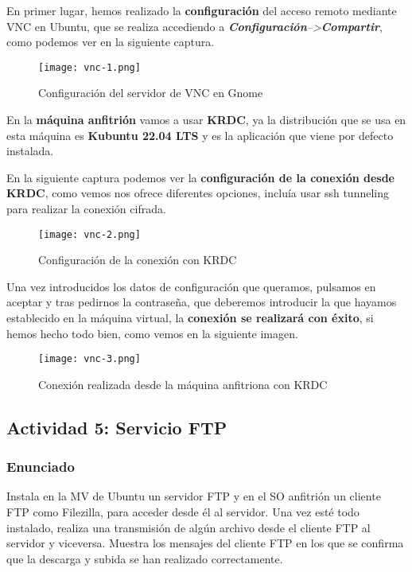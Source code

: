 \begin{itemize}
    En primer lugar, hemos realizado la \textbf{configuración} del acceso remoto mediante VNC en Ubuntu, que se realiza accediendo a \textit{\textbf{Configuración}-->\textbf{Compartir}}, como podemos ver en la siguiente captura.

    \begin{figure}[H]
        \centering
        \texttt{[image: vnc-1.png]}
        \caption{Configuración del servidor de VNC en Gnome}
    \end{figure}

    En la \textbf{máquina anfitrión} vamos a usar \textbf{KRDC}, ya la distribución que se usa en esta máquina es \textbf{Kubuntu 22.04 LTS} y es la aplicación que viene por defecto instalada.

    En la siguiente captura podemos ver la \textbf{configuración de la conexión desde KRDC}, como vemos nos ofrece diferentes opciones, incluía usar ssh tunneling para realizar la conexión cifrada.

    \begin{figure}[H]
        \centering
        \texttt{[image: vnc-2.png]}
        \caption{Configuración de la conexión con KRDC}
    \end{figure}

    Una vez introducidos los datos de configuración que queramos, pulsamos en aceptar y tras pedirnos la contraseña, que deberemos introducir la que hayamos establecido en la máquina virtual, la \textbf{conexión se realizará con éxito}, si hemos hecho todo bien, como vemos en la siguiente imagen.

    \begin{figure}[H]
        \centering
        \texttt{[image: vnc-3.png]}
        \caption{Conexión realizada desde la máquina anfitriona con KRDC}
    \end{figure}
\end{itemize}

\subsection{Actividad 5: Servicio FTP}

\subsubsection{Enunciado}
Instala en la MV de Ubuntu un servidor FTP y en el SO anfitrión un cliente FTP como Filezilla, para acceder desde él al servidor. Una vez esté todo instalado, realiza una transmisión de algún archivo desde el cliente FTP al servidor y viceversa. Muestra los mensajes del cliente FTP en los que se confirma que la descarga y subida se han realizado correctamente.

